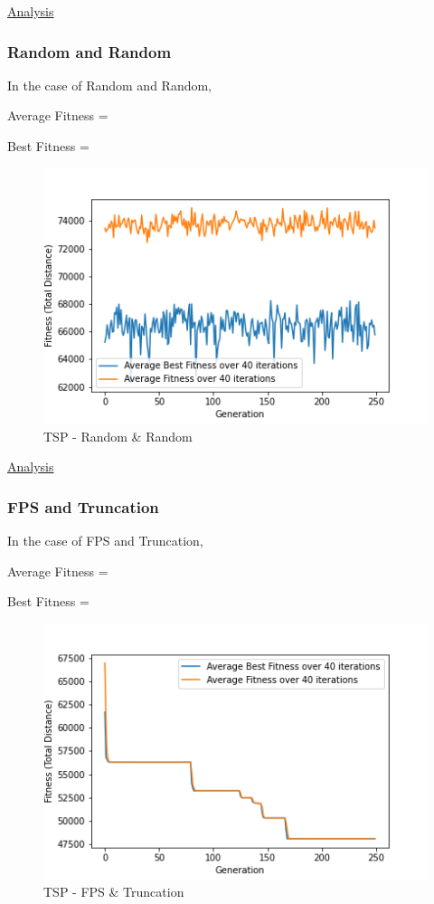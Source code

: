 \documentclass[11pt, letterpaper]{article}
\begin{document}
\underline{Analysis}
\subsubsection {Random and Random}
In the case of Random and Random,

Average Fitness = 

Best Fitness = 
\begin{figure}[H]
    \centering
    \includegraphics[scale = 0.6]{images/tsp_rd_rd.png}
    \caption {TSP - Random \& Random}
    \label {fig:tpsRR}
\end{figure}

\underline{Analysis}
\subsubsection {FPS and Truncation}
In the case of FPS and Truncation,

Average Fitness = 

Best Fitness = 
\begin{figure}[H]
    \centering
    \includegraphics[scale = 0.6]{images/tsp_fp_tr.png}
    \caption {TSP - FPS \& Truncation}
    \label {fig:tpsFT}
\end{figure}
\end{document}
